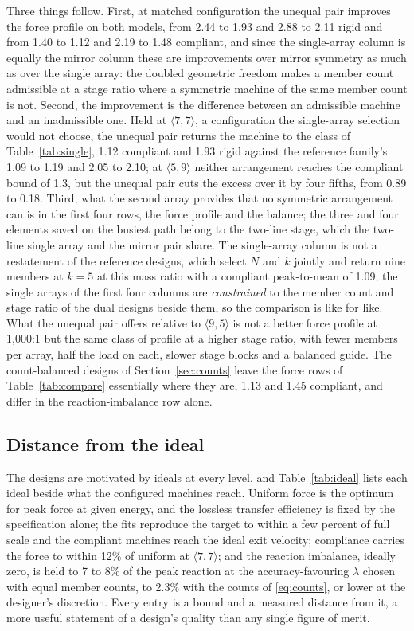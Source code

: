 \documentclass[preprint,12pt,number]{elsarticle}
\newcommand{\cfg}[2]{\langle #1,#2\rangle}
\newcommand{\ptm}{peak-to-mean}
\begin{document}
Three things follow. First, at matched configuration the unequal pair improves the force profile on both models, from 2.44 to 1.93 and 2.88 to 2.11 rigid and from 1.40 to 1.12 and 2.19 to 1.48 compliant, and since the single-array column is equally the mirror column these are improvements over mirror symmetry as much as over the single array: the doubled geometric freedom makes a member count admissible at a stage ratio where a symmetric machine of the same member count is not. Second, the improvement is the difference between an admissible machine and an inadmissible one. Held at $\cfg{7}{7}$, a configuration the single-array selection would not choose, the unequal pair returns the machine to the class of Table~\ref{tab:single}, 1.12 compliant and 1.93 rigid against the reference family's 1.09 to 1.19 and 2.05 to 2.10; at $\cfg{5}{9}$ neither arrangement reaches the compliant bound of 1.3, but the unequal pair cuts the excess over it by four fifths, from 0.89 to 0.18. Third, what the second array provides that no symmetric arrangement can is in the first four rows, the force profile and the balance; the three and four elements saved on the busiest path belong to the two-line stage, which the two-line single array and the mirror pair share. The single-array column is not a restatement of the reference designs, which select $N$ and $k$ jointly and return nine members at $k=5$ at this mass ratio with a compliant \ptm{} of 1.09; the single arrays of the first four columns are \emph{constrained} to the member count and stage ratio of the dual designs beside them, so the comparison is like for like. What the unequal pair offers relative to $\cfg{9}{5}$ is not a better force profile at 1,000:1 but the same class of profile at a higher stage ratio, with fewer members per array, half the load on each, slower stage blocks and a balanced guide. The count-balanced designs of Section~\ref{sec:counts} leave the force rows of Table~\ref{tab:compare} essentially where they are, 1.13 and 1.45 compliant, and differ in the reaction-imbalance row alone.

\subsection{Distance from the ideal}
\label{sec:ideal}

The designs are motivated by ideals at every level, and Table~\ref{tab:ideal} lists each ideal beside what the configured machines reach. Uniform force is the optimum for peak force at given energy, and the lossless transfer efficiency is fixed by the specification alone; the fits reproduce the target to within a few percent of full scale and the compliant machines reach the ideal exit velocity; compliance carries the force to within 12\% of uniform at $\cfg{7}{7}$; and the reaction imbalance, ideally zero, is held to 7 to 8\% of the peak reaction at the accuracy-favouring $\lambda$ chosen with equal member counts, to 2.3\% with the counts of \eqref{eq:counts}, or lower at the designer's discretion. Every entry is a bound and a measured distance from it, a more useful statement of a design's quality than any single figure of merit.
\end{document}
